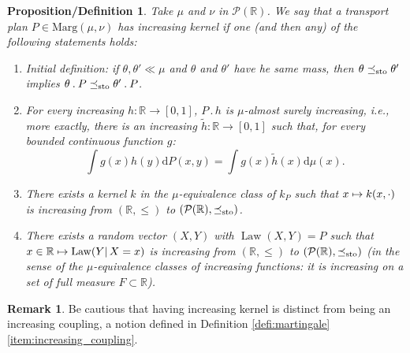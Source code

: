 \documentclass[11pt]{article}
\newcommand{\ie}{i.e.,\xspace}
\newcommand{\ldot}{\mathbin{.}}
\newcommand\mto{\mathchoice{\longmapsto}{\mapsto}{\mapsto}{\mapsto}}
\theoremstyle{plain}
\newtheorem{prodefinition}[them]{Proposition/Definition}
\theoremstyle{definition}
\newtheorem{rem}[them]{Remark}
\newcommand{\dd}{\mathrm{d}}
\newcommand{\p}{\mathcal{P}}
\newcommand{\ma}{\mathrm{Marg}}
\newcommand{\R}{\mathbb{R}}
\newcommand{\law}{\operatorname{Law}}
\newcommand{\leqs}{\preceq_{\text{\rm sto}}}
\begin{document}
\begin{prodefinition}\label{prodef:transitions}
Take $\mu$ and $\nu$ in $\p(\R)$. We say that a transport plan $P\in\ma(\mu,\nu)$ has \emph{increasing kernel} if one (and then any) of the following statements holds:
\begin{enumerate}
\item\label{prodef:transitionsa}
\label{item:transitions_croissantes_application_croissante} Initial definition: if $\theta,\theta'\ll \mu$ and $\theta$ and $\theta'$ have he same mass, then $\theta\leqs \theta'$ implies $\theta \ldot P\leqs \theta'\ldot P$.

\item\label{prodef:transitionsb}
\label{pt:condexp} For every increasing $h:\R\to[0,1]$, $P\ldot h$ is $\mu$-almost surely increasing, \ie more exactly, there is an increasing $\tilde{h}:\R\to [0,1]$ such that, for every bounded continuous function $g$:
\[\int g(x)h(y) \dd P(x,y)= \int g(x)\tilde{h}(x)\dd \mu(x).\]

\item\label{prodef:transitionsc}
There exists a kernel $k$ in the $\mu$-equivalence class of $k_P$ such that $x\mto k(x,\cdot)$ is increasing from $(\R,\leq)$ to $(\p(\R),\leqs)$.

\item\label{prodef:transitionsd}
There exists a random vector $(X,Y)$ with $\law(X,Y)=P$ such that $x\in\R\mto\law(Y|\,X=x)$ is increasing from $(\R,\leq)$ to $(\p(\R),\leqs)$ (in the sense of the $\mu$\nobreakdash-equi\-valence classes of {\small increasing} functions: it is increasing on a set of full measure $F\subset \R$).
\end{enumerate}
\end{prodefinition}

\begin{rem}Be cautious that having increasing kernel is distinct from being an increasing coupling, a notion defined in Definition \ref{defi:martingale}\eqref{item:increasing_coupling}.
\end{rem}
\end{document}
